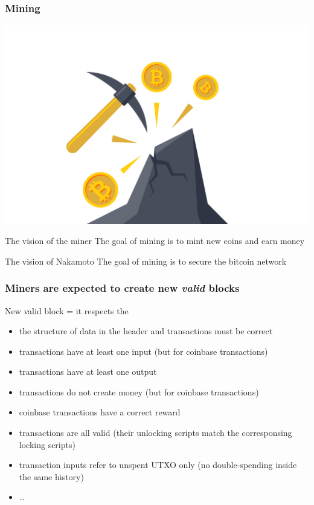 \documentclass[11pt]{beamer}  %
\begin{document}
\begin{frame}\frametitle{Mining}

  \begin{center}
    \includegraphics[scale=0.1,clip=false]{pictures/mining.png}
  \end{center}

  \bigskip

  \begin{greenbox}{The vision of the miner}
    The goal of mining is to mint new coins and earn money
  \end{greenbox}

  \bigskip

  \begin{greenbox}{The vision of Nakamoto}
    The goal of mining is to secure the bitcoin network
  \end{greenbox}

\end{frame}

\begin{frame}\frametitle{Miners are expected to create new \emph{valid} blocks}

  \begin{greenbox}{New valid block = it respects the {\color{pink}{consensus rules}}}
    \begin{itemize}
    \item the structure of data in the header and transactions must be correct
    \item transactions have at least one input (but for coinbase transactions)
    \item transactions have at least one output
    \item transactions do not create money (but for coinbase transactions)
    \item coinbase transactions have a correct reward
    \item transactions are all valid (their unlocking scripts match the corresponsing locking scripts)
    \item transaction inputs refer to unspent UTXO only
      (\alert{no double-spending inside the same history})
    \item \ldots
    \end{itemize}
  \end{greenbox}
  
\end{frame}
\end{document}

